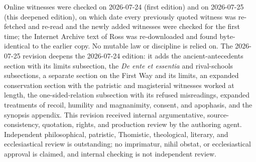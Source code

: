 Online witnesses were checked on 2026-07-24 (first edition) and on 2026-07-25 (this deepened edition), on which date every previously quoted witness was re-fetched and re-read and the newly added witnesses were checked for the first time; the Internet Archive text of Ross was re-downloaded and found byte-identical to the earlier copy. No mutable law or discipline is relied on. The 2026-07-25 revision deepens the 2026-07-24 edition: it adds the ancient-antecedents section with its limits subsection, the \emph{De ente et essentia} and rival-schools subsections, a separate section on the First Way and its limits, an expanded conservation section with the patristic and magisterial witnesses worked at length, the one-sided-relation subsection with its refused misreadings, expanded treatments of recoil, humility and magnanimity, consent, and apophasis, and the synopsis appendix. This revision received internal argumentative, source-consistency, quotation, rights, and production review by the authoring agent. Independent philosophical, patristic, Thomistic, theological, literary, and ecclesiastical review is outstanding; no imprimatur, nihil obstat, or ecclesiastical approval is claimed, and internal checking is not independent review.

